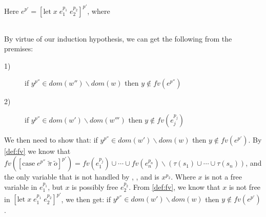 \item[\runa{Case}] Here $e^{p'}=[\mbox{let}\;x\;e_1^{p_1}\;e_2^{p_2}]^{p'}$, where
\begin{figure}[H]
	\setlength\tabcolsep{8pt}
	\begin{tabular}{l}
		
	\end{tabular}
\end{figure}
By virtue of our induction hypothesis, we can get the following from the premises:
\begin{description}
	\item[1)] if $y^{p''}\in dom(w'')\backslash dom(w)$ then $y\notin fv(e^{p''})$
	\item[2)] if $y^{p''}\in dom(w')\backslash dom(w''')$ then $y\notin fv(e_j^{p_j})$
\end{description}
We then need to show that: if $y^{p''}\in dom(w')\backslash dom(w)$ then $y\notin fv(e^{p'})$.
By \cref{def:fv} we know that $fv([\mbox{case}\;e^{p''}\;\tilde{\pi}\;\tilde{o}]^{p'})=fv(e_1^{p_j})\cup\cdots\cup fv(e_n^{p_n})\backslash(\tau(s_1)\cup\cdots\cup\tau(s_n))$, and the only variable that is not handled by , , and  is $x^{p_2}$.
Where $x$ is not a free variable in $e_1^{p_1}$, but $x$ is possibly free $e_2^{p_2}$.
From \cref{def:fv}, we know that $x$ is not free in $[\mbox{let}\;x\;e_1^{p_1}\;e_2^{p_2}]^{p'}$, we then get: if $y^{p''}\in dom(w')\backslash dom(w)$ then $y\notin fv(e^{p'})$.
